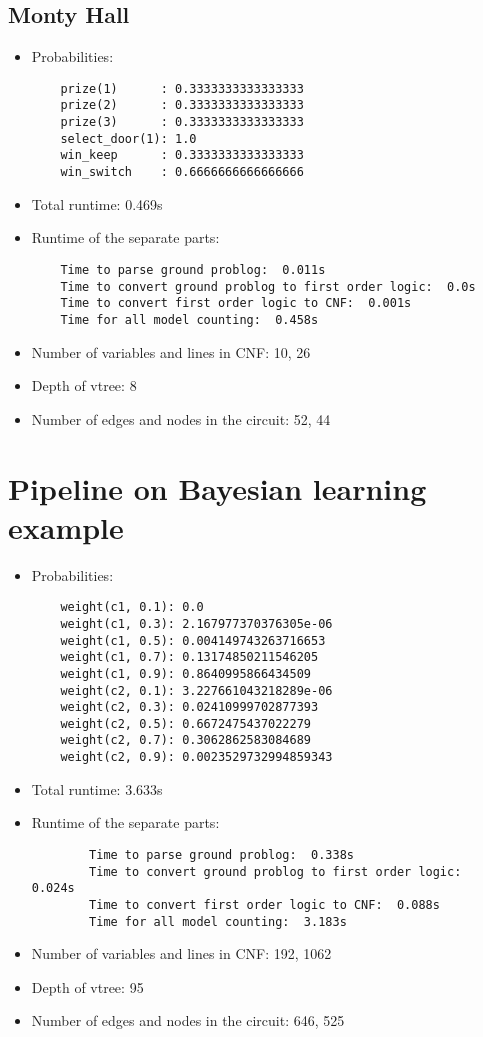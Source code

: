 \subsection{Monty Hall}
\begin{itemize}
    \item Probabilities:
    \begin{lstlisting}
    prize(1)      : 0.3333333333333333
    prize(2)      : 0.3333333333333333
    prize(3)      : 0.3333333333333333
    select_door(1): 1.0
    win_keep      : 0.3333333333333333
    win_switch    : 0.6666666666666666
    \end{lstlisting}
    \item Total runtime: 0.469s
    \item Runtime of the separate parts:
    \begin{lstlisting}
    Time to parse ground problog:  0.011s
    Time to convert ground problog to first order logic:  0.0s
    Time to convert first order logic to CNF:  0.001s
    Time for all model counting:  0.458s
    \end{lstlisting}
    \item Number of variables and lines in CNF: 10, 26
    \item Depth of vtree: 8
    \item Number of edges and nodes in the circuit: 52, 44
\end{itemize}

\section{Pipeline on Bayesian learning example}
\begin{itemize}
    \item Probabilities:
    \begin{lstlisting}
    weight(c1, 0.1): 0.0
    weight(c1, 0.3): 2.167977370376305e-06
    weight(c1, 0.5): 0.004149743263716653
    weight(c1, 0.7): 0.13174850211546205
    weight(c1, 0.9): 0.8640995866434509
    weight(c2, 0.1): 3.227661043218289e-06
    weight(c2, 0.3): 0.02410999702877393
    weight(c2, 0.5): 0.6672475437022279
    weight(c2, 0.7): 0.3062862583084689
    weight(c2, 0.9): 0.0023529732994859343
    \end{lstlisting}

    \item Total runtime: 3.633s
    \item Runtime of the separate parts:
    \begin{lstlisting}
        Time to parse ground problog:  0.338s
        Time to convert ground problog to first order logic:  0.024s
        Time to convert first order logic to CNF:  0.088s
        Time for all model counting:  3.183s
    \end{lstlisting}

    \item Number of variables and lines in CNF: 192, 1062
    \item Depth of vtree: 95
    \item Number of edges and nodes in the circuit: 646, 525
\end{itemize}

